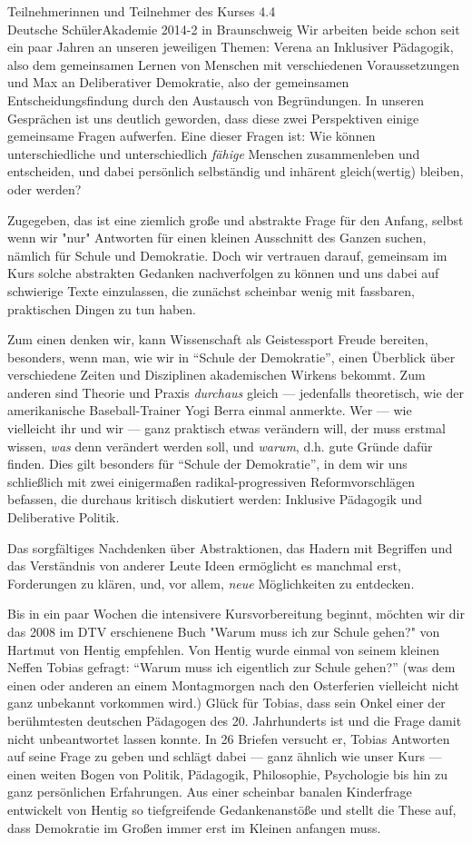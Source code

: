 \documentclass[a4paper]{letter}
\begin{document}
\begin{letter}{
	Teilnehmerinnen und Teilnehmer des Kurses 4.4 \\
	Deutsche SchülerAkademie 2014-2 in Braunschweig}
Wir arbeiten beide schon seit ein paar Jahren an unseren jeweiligen Themen: Verena an Inklusiver Pädagogik, also dem gemeinsamen Lernen von Menschen mit verschiedenen Voraussetzungen und Max an Deliberativer Demokratie, also der gemeinsamen Entscheidungsfindung durch den Austausch von Begründungen.
In unseren Gesprächen ist uns deutlich geworden, dass diese zwei Perspektiven einige gemeinsame Fragen aufwerfen.
Eine dieser Fragen ist:
Wie können unterschiedliche und unterschiedlich \emph{fähige} Menschen zusammenleben und entscheiden, und dabei persönlich selbständig und inhärent gleich(wertig) bleiben, oder werden?

Zugegeben, das ist eine ziemlich große und abstrakte Frage für den Anfang, selbst wenn wir "nur" Antworten für einen kleinen Ausschnitt des Ganzen suchen, nämlich für Schule und Demokratie.
Doch wir vertrauen darauf, gemeinsam im Kurs solche abstrakten Gedanken nachverfolgen zu können und uns dabei auf schwierige Texte einzulassen, die zunächst scheinbar wenig mit fassbaren, praktischen Dingen zu tun haben.

Zum einen denken wir, kann Wissenschaft als Geistessport Freude bereiten, besonders, wenn man, wie wir in ``Schule der Demokratie'', einen Überblick über verschiedene Zeiten und Disziplinen akademischen Wirkens bekommt.
Zum anderen sind Theorie und Praxis \emph{durchaus} gleich --- jedenfalls theoretisch, wie der amerikanische Baseball-Trainer Yogi Berra einmal anmerkte.
Wer --- wie vielleicht ihr und wir --- ganz praktisch etwas verändern will, der muss erstmal wissen, \emph{was} denn verändert werden soll, und \emph{warum}, d.h. gute Gründe dafür finden.
Dies gilt besonders für ``Schule der Demokratie'', in dem wir uns schließlich mit zwei einigermaßen radikal-progressiven Reformvorschlägen befassen, die durchaus kritisch diskutiert werden: Inklusive Pädagogik und Deliberative Politik.

Das sorgfältiges Nachdenken über Abstraktionen, das Hadern mit Begriffen und das Verständnis von anderer Leute Ideen ermöglicht es manchmal erst, Forderungen zu klären, und, vor allem, \emph{neue} Möglichkeiten zu entdecken.

Bis in ein paar Wochen die intensivere Kursvorbereitung beginnt, möchten wir dir das 2008 im DTV erschienene Buch "Warum muss ich zur Schule gehen?" von Hartmut von Hentig empfehlen.
Von Hentig wurde einmal von seinem kleinen Neffen Tobias gefragt: ``Warum muss ich eigentlich zur Schule gehen?'' (was dem einen oder anderen an einem Montagmorgen nach den Osterferien vielleicht nicht ganz unbekannt vorkommen wird.)
Glück für Tobias, dass sein Onkel einer der berühmtesten deutschen Pädagogen des 20. Jahrhunderts ist und die Frage damit nicht unbeantwortet lassen konnte.
In 26 Briefen versucht er, Tobias Antworten auf seine Frage zu geben und schlägt dabei --- ganz ähnlich wie unser Kurs --- einen weiten Bogen von Politik, Pädagogik, Philosophie, Psychologie bis hin zu ganz persönlichen Erfahrungen.
Aus einer scheinbar banalen Kinderfrage entwickelt von Hentig so tiefgreifende Gedankenanstöße und stellt die These auf, dass Demokratie im Großen immer erst im Kleinen anfangen muss.


\end{letter}
\end{document}
